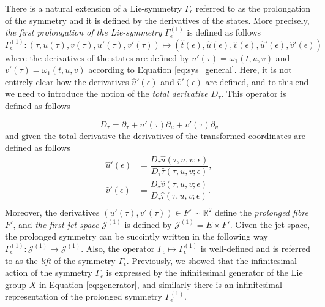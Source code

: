 There is a natural extension of a Lie-symmetry $\Gamma_\epsilon$ referred to as the prolongation of the symmetry and it is defined by the derivatives of the states. More precisely, \textit{the first prolongation of the Lie-symmetry} $\Gamma^{(1)}_{\epsilon}$ is defined as follows
\begin{equation}
\Gamma_{\epsilon}^{(1)}:(\tau,u(\tau),v(\tau),u'(\tau),v'(\tau))\mapsto(\hat{t}(\epsilon),\hat{u}(\epsilon),\hat{v}(\epsilon),\hat{u}'(\epsilon),\hat{v}'(\epsilon))
  \label{eq:prolongation}
\end{equation}
where the derivatives of the states are defined by $u'(\tau)=\omega_1(t,u,v)$ and $v'(\tau)=\omega_1(t,u,v)$ according to Equation \eqref{eq:sys_general}. Here, it is not entirely clear how the derivatives $\hat{u}'(\epsilon)$ and $\hat{v}'(\epsilon)$ are defined, and to this end we need to introduce the notion of the \textit{total derivative} $D_\tau$. This operator is defined as follows

\begin{equation}
D_\tau=\partial_\tau+u'(\tau)\partial_u+v'(\tau)\partial_v
  \label{eq:tot_der}
  \end{equation}
  and given the total derivative the derivatives of the transformed coordinates are defined as follows
  \begin{equation}
    \begin{split}
      \hat{u}'(\epsilon)&=\dfrac{D_\tau \hat{u}(\tau,u,v;\epsilon)}{D_\tau\hat{\tau}(\tau,u,v;\epsilon)},\\
      \hat{v}'(\epsilon)&=\dfrac{D_\tau \hat{v}(\tau,u,v;\epsilon)}{D_\tau\hat{\tau}(\tau,u,v;\epsilon)}.\\
    \end{split}
    \label{eq:extended_derivatives}
    \end{equation}
    Moreover, the derivatives $(u'(\tau),v'(\tau))\in F'\sim\mathbb{R}^2$ define the \textit{prolonged fibre} $F'$, and \textit{the first jet space} $\mathcal{J}^{(1)}$ is defined by $\mathcal{J}^{(1)}=E\times F'$. Given the jet space, the prolonged symmetry can be succintly written in the following way $\Gamma^{(1)}_{\epsilon}:\mathcal{J}^{(1)}\mapsto\mathcal{J}^{(1)}$. Also, the operator $\Gamma_\epsilon\mapsto\Gamma^{(1)}_{\epsilon}$ is well-defined and is referred to as the \textit{lift} of the symmetry $\Gamma_{\epsilon}$. Previously, we showed that the infinitesimal action of the symmetry $\Gamma_{\epsilon}$ is expressed by the infinitesimal generator of the Lie group $X$ in Equation \eqref{eq:generator}, and similarly there is an infinitesimal representation of the prolonged symmetry $\Gamma^{(1)}_{\epsilon}$.

